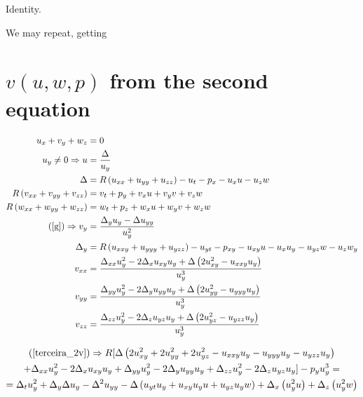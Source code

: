 \documentclass[12pt,a4paper]{article}
\begin{document}
  Identity.

	\begin{flushright}
	\end{flushright}

	We may repeat, getting

	\section{$v(u,w,p)$ from the second equation}

	\begin{align}
	  u_x + v_y + w_z &= 0 \label{primeira_2v} \\
	  u_y \neq 0 \Rightarrow u &= \frac{\Delta}{u_y} \\
	  \Delta &= R \left(u_{xx} + u_{yy} + u_{zz} \right) - u_t - p_x - u_x u - u_z w \\
	  R \left(v_{xx} + v_{yy} + v_{zz} \right) &= v_t + p_y + v_x u + v_y v + v_z w \label{terceira_2v} \\
	  R \left(w_{xx} + w_{yy} + w_{zz} \right) &= w_t + p_z + w_x u + w_y v + w_z w \label{quarta_2v} \\
	  (\ref{g}) \Rightarrow v_y &= \frac{\Delta_y u_y - \Delta u_{yy}}{u_y^2} \\
	  \Delta_y &= R \left(u_{xxy} + u_{yyy} + u_{yzz} \right) - u_{yt} - p_{xy} - u_{xy} u - u_x u_y - u_{yz} w - u_z w_y \\
	  v_{xx} &= \frac{\Delta_{xx} u_y^2 - 2\Delta_x u_{xy} u_y + \Delta \left( 2u_{xy}^2 - u_{xxy} u_y \right)}{u_y^3} \\
	  v_{yy} &= \frac{\Delta_{yy} u_y^2 - 2\Delta_y u_{yy} u_y + \Delta \left( 2u_{yy}^2 - u_{yyy} u_y \right)}{u_y^3} \\
	  v_{zz} &= \frac{\Delta_{zz} u_y^2 - 2\Delta_z u_{yz} u_y + \Delta \left( 2u_{yz}^2 - u_{yzz} u_y \right)}{u_y^3}
	\end{align}

	\begin{multline}
    (\ref{terceira_2v}) \Rightarrow R [\Delta \left( 2 u_{xy}^2 + 2 u_{yy}^2 + 2 u_{yz}^2 - u_{xxy}u_y - u_{yyy} u_y - u_{yzz} u_y \right) \\
    + \Delta_{xx} u_y^2 - 2\Delta_x u_{xy} u_y + \Delta_{yy} u_y^2 - 2\Delta_y u_{yy} u_y + \Delta_{zz} u_y^2 - 2\Delta_z u_{yz} u_y ] - p_y u_y^3 = \\
    = \Delta_t u_y^2 + \Delta_y \Delta u_y - \Delta^2 u_{yy} - \Delta \left(u_{yt} u_y + u_{xy} u_y u + u_{yz} u_y w \right) + \Delta_x \left(u_y^2 u \right) + \Delta_z \left(u_y^2 w \right)
	\end{multline}
\end{document}
